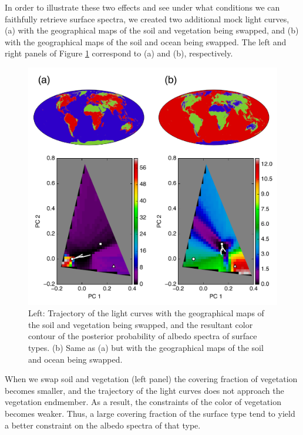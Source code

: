\documentclass[iop,numberedappendix,apj,]{emulateapj}
\begin{document}
In order to illustrate these two effects and see under what conditions we can faithfully retrieve surface spectra, we created two additional mock light curves, (a) with the geographical maps of the soil and vegetation being swapped, and  (b) with the geographical maps of the soil and ocean being swapped. 
The left and right panels of Figure \ref{fig:swap} correspond to (a) and (b), respectively. 

\begin{figure}[htb!]
    \begin{center}
    \includegraphics[width=\hsize]{swap.pdf}
    \end{center}
    \caption{Left: Trajectory of the light curves with the geographical maps of the soil and vegetation being swapped, and the resultant color contour of the posterior probability of albedo spectra of surface types. (b) Same as (a) but with the geographical maps of the soil and ocean being swapped.}
\label{fig:swap}
\end{figure}

When we swap soil and vegetation (left panel) the covering fraction of vegetation becomes smaller, and the trajectory of the light curves does not approach the vegetation endmember. As a result, the constraints of the color of vegetation becomes weaker. Thus, a large covering fraction of the surface type tend to yield a better constraint on the albedo spectra of that type. 
\end{document}
